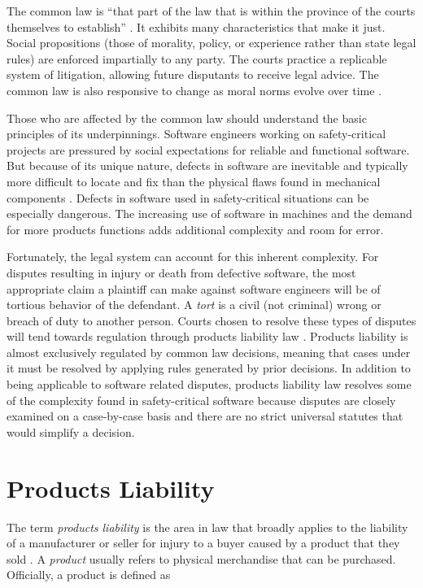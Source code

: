 \documentclass[12pt]{report}
\begin{document}
The common law is ``that part of the law that is within the province of the courts themselves to establish'' \cite{FAKE}. It exhibits many characteristics that make it just. Social propositions (those of morality, policy, or experience rather than state legal rules) are enforced impartially to any party. The courts practice a replicable system of litigation, allowing future disputants to receive legal advice. The common law is also responsive to change as moral norms evolve over time \cite{FAKE}.  

Those who are affected by the common law should understand the basic principles of its underpinnings. Software engineers working on safety-critical projects are pressured by social expectations for reliable and functional software. But because of its unique nature, defects in software are inevitable and typically more difficult to locate and fix than the physical flaws found in mechanical components \cite{Parnas90}. Defects in software used in safety-critical situations can be especially dangerous. The increasing use of software in machines and the demand for more products functions adds additional complexity and room for error. 

Fortunately, the legal system can account for this inherent complexity. For disputes resulting in injury or death from defective software, the most appropriate claim a plaintiff can make against software engineers will be of tortious behavior of the defendant. A \textit{tort} is a civil (not criminal) wrong or breach of duty to another person. Courts chosen to resolve these types of disputes will tend towards regulation through products liability law \cite{FAKE}. Products liability is almost exclusively regulated by common law decisions, meaning that cases under it must be resolved by applying rules generated by prior decisions. In addition to being applicable to software related disputes, products liability law resolves some of the complexity found in safety-critical software because disputes are closely examined on a case-by-case basis and there are no strict universal statutes that would simplify a decision. 

\section{Products Liability}  
The term \textit{products liability} is the area in law that broadly applies to the liability of a manufacturer or seller for injury to a buyer caused by a product that they sold \cite{FAKE}. A \textit{product} usually refers to physical merchandise that can be purchased. Officially, a product is defined as  
\end{document}
